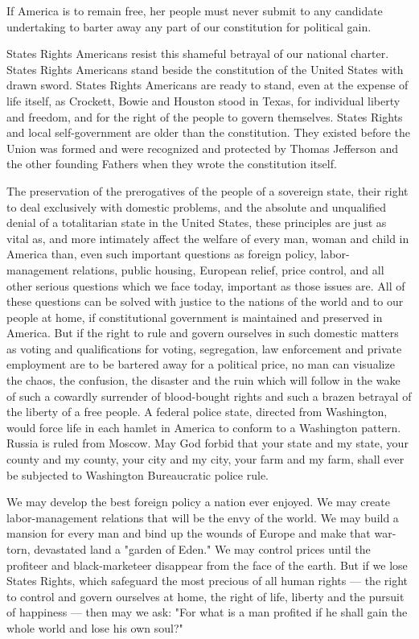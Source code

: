 \documentclass[10pt,a4paper]{article}
\begin{document}
If America is to remain free, her people must never submit to any candidate undertaking to barter away any part of our constitution for political gain.

States Rights Americans resist this shameful betrayal of our national charter. States Rights Americans stand beside the constitution of the United States with drawn sword. States Rights Americans are ready to stand, even at the expense of life itself, as Crockett, Bowie and Houston stood in Texas, for individual liberty and freedom, and for the right of the people to govern themselves. States Rights and local self-government are older than the constitution. They existed before the Union was formed and were recognized and protected by Thomas Jefferson and the other founding Fathers when they wrote the constitution itself.

The preservation of the prerogatives of the people of a sovereign state, their right to deal exclusively with domestic problems, and the absolute and unqualified denial of a totalitarian state in the United States, these principles are just as vital as, and more intimately affect the welfare of every man, woman and child in America than, even such important questions as foreign policy, labor-management relations, public housing, European relief, price control, and all other serious questions which we face today, important as those issues are. All of these questions can be solved with justice to the nations of the world and to our people at home, if constitutional government is maintained and preserved in America. But if the right to rule and govern ourselves in such domestic matters as voting and qualifications for voting, segregation, law enforcement and private employment are to be bartered away for a political price, no man can visualize the chaos, the confusion, the disaster and the ruin which will follow in the wake of such a cowardly surrender of blood-bought rights and such a brazen betrayal of the liberty of a free people. A federal police state, directed from Washington, would force life in each hamlet in America to conform to a Washington pattern. Russia is ruled from Moscow. May God forbid that your state and my state, your county and my county, your city and my city, your farm and my farm, shall ever be subjected to Washington Bureaucratic police rule.

We may develop the best foreign policy a nation ever enjoyed. We may create labor-management relations that will be the envy of the world. We may build a mansion for every man and bind up the wounds of Europe and make that war-torn, devastated land a "garden of Eden." We may control prices until the profiteer and black-marketeer disappear from the face of the earth. But if we lose States Rights, which safeguard the most precious of all human rights — the right to control and govern ourselves at home, the right of life, liberty and the pursuit of happiness — then may we ask: "For what is a man profited if he shall gain the whole world and lose his own soul?"
\end{document}
